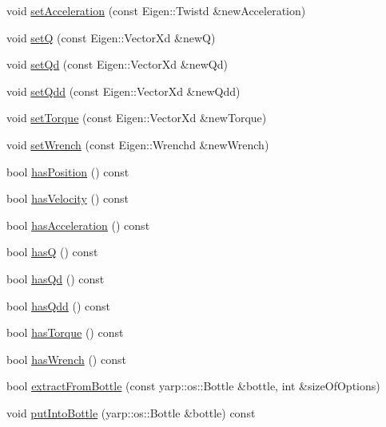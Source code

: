 \begin{DoxyCompactItemize}
\item 
void \hyperlink{classocra_1_1TaskState_ab408a5c4b442ac5ad3f5d50fec1aefdb}{set\+Acceleration} (const Eigen\+::\+Twistd \&new\+Acceleration)
\item 
void \hyperlink{classocra_1_1TaskState_a2a1821ebe86ba99e305debf366ce77f1}{setQ} (const Eigen\+::\+Vector\+Xd \&newQ)
\item 
void \hyperlink{classocra_1_1TaskState_a69d8a03ebd5c2c41e8108ff4b845ae49}{set\+Qd} (const Eigen\+::\+Vector\+Xd \&new\+Qd)
\item 
void \hyperlink{classocra_1_1TaskState_aa5e16bbe025ef970a18a12e0fe841c80}{set\+Qdd} (const Eigen\+::\+Vector\+Xd \&new\+Qdd)
\item 
void \hyperlink{classocra_1_1TaskState_a412f64cf9b8bc08186a83c5afda7cb7d}{set\+Torque} (const Eigen\+::\+Vector\+Xd \&new\+Torque)
\item 
void \hyperlink{classocra_1_1TaskState_a030fc926c45428d7ef99deb70ce5153e}{set\+Wrench} (const Eigen\+::\+Wrenchd \&new\+Wrench)
\item 
bool \hyperlink{classocra_1_1TaskState_aa49ed2fbf811e8ffb923f3f70158012a}{has\+Position} () const 
\item 
bool \hyperlink{classocra_1_1TaskState_ae5032cde18e8c8042d5f6f5859cbde4f}{has\+Velocity} () const 
\item 
bool \hyperlink{classocra_1_1TaskState_a3a1bce0fcccae5ae90f85e46f6623f6c}{has\+Acceleration} () const 
\item 
bool \hyperlink{classocra_1_1TaskState_a8434ed2cd498da32f0d582d8242794f3}{hasQ} () const 
\item 
bool \hyperlink{classocra_1_1TaskState_af896ae07fc0ed76cbbee439691c6f814}{has\+Qd} () const 
\item 
bool \hyperlink{classocra_1_1TaskState_a71d4b93521cf22a99afad9c92d6cc8d2}{has\+Qdd} () const 
\item 
bool \hyperlink{classocra_1_1TaskState_abad9d0f987dfdb93181b49e802da44d7}{has\+Torque} () const 
\item 
bool \hyperlink{classocra_1_1TaskState_aa15bb6426460f404fdc3a24acf9e1c76}{has\+Wrench} () const 
\item 
bool \hyperlink{classocra_1_1TaskState_a64816fe1fdea6deaf1abfef335ab36c7}{extract\+From\+Bottle} (const yarp\+::os\+::\+Bottle \&bottle, int \&size\+Of\+Options)
\item 
void \hyperlink{classocra_1_1TaskState_a4d51ddc127d4fd3932d880dfcd8da2bb}{put\+Into\+Bottle} (yarp\+::os\+::\+Bottle \&bottle) const 
\end{DoxyCompactItemize}

